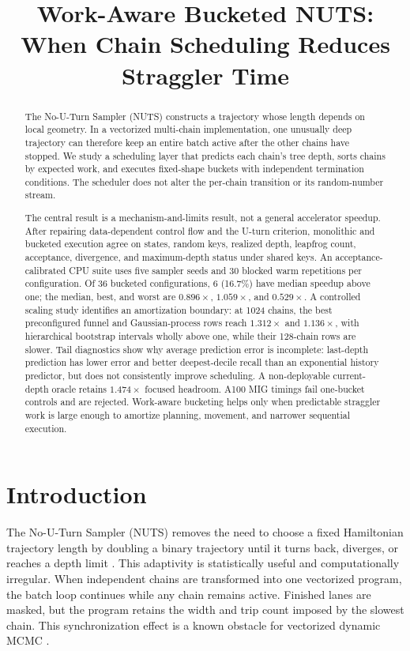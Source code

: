 \documentclass[conference]{IEEEtran}
\title{Work-Aware Bucketed NUTS:\\
When Chain Scheduling Reduces Straggler Time}
\author{\IEEEauthorblockN{Viktor Najdovski}
\IEEEauthorblockA{Faculty of Computer Science and Engineering\\
Ss.\ Cyril and Methodius University\\
Skopje, North Macedonia\\
viktornajdovski@students.finki.ukim.mk}}
\begin{document}
\maketitle

\begin{abstract}
The No-U-Turn Sampler (NUTS) constructs a trajectory whose length depends on
local geometry.  In a vectorized multi-chain implementation, one unusually deep
trajectory can therefore keep an entire batch active after the other chains
have stopped.  We study a scheduling layer that predicts each chain's tree
depth, sorts chains by expected work, and executes fixed-shape buckets with
independent termination conditions.  The scheduler does not alter the
per-chain transition or its random-number stream.

The central result is a mechanism-and-limits result, not a general accelerator
speedup.  After repairing data-dependent control flow and the U-turn criterion,
monolithic and bucketed execution agree on states, random keys, realized depth,
leapfrog count, acceptance, divergence, and maximum-depth status under shared
keys.  An acceptance-calibrated CPU suite uses five sampler seeds and 30 blocked
warm repetitions per configuration.  Of 36 bucketed configurations, 6 (16.7\%)
have median speedup above one; the median, best, and worst are $0.896\times$,
$1.059\times$, and $0.529\times$.  A controlled scaling study identifies an
amortization boundary: at 1024 chains, the best preconfigured funnel and
Gaussian-process rows reach $1.312\times$ and $1.136\times$, with hierarchical
bootstrap intervals wholly above one, while their 128-chain rows are slower.
Tail diagnostics show why average prediction error is incomplete: last-depth
prediction has lower error and better deepest-decile recall than an exponential
history predictor, but does not consistently improve scheduling.  A
non-deployable current-depth oracle retains $1.474\times$ focused headroom.
A100 MIG timings fail one-bucket controls and are rejected.  Work-aware
bucketing helps only when predictable straggler work is large enough to
amortize planning, movement, and narrower sequential execution.
\end{abstract}

\section{Introduction}

The No-U-Turn Sampler (NUTS) removes the need to choose a fixed Hamiltonian
trajectory length by doubling a binary trajectory until it turns back,
diverges, or reaches a depth limit \cite{hoffman2014nuts}.  This adaptivity is
statistically useful and computationally irregular.  When independent chains
are transformed into one vectorized program, the batch loop continues while
any chain remains active.  Finished lanes are masked, but the program retains
the width and trip count imposed by the slowest chain.  This synchronization
effect is a known obstacle for vectorized dynamic MCMC
\cite{radul2020autobatching,dance2025fsm}.
\end{document}
